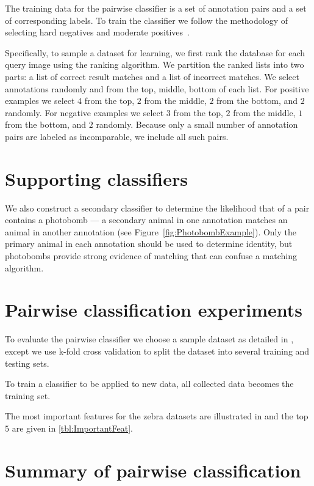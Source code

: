 The training data for the pairwise classifier is a set of annotation pairs and
  a set of corresponding labels.
To train the classifier we follow the methodology of selecting hard negatives
  and moderate positives~\cite{shi_embedding_2016}.

Specifically, to sample a dataset for learning, we first rank the database for
  each query image using the ranking algorithm.
We partition the ranked lists into two parts:
a list of correct result matches and a list of incorrect matches.
We select annotations randomly and from the top, middle, bottom of each list.
For positive examples we select $4$ from the top, $2$ from the middle, $2$
  from the bottom, and $2$ randomly.
For negative examples we select $3$ from the top, $2$ from the middle, $1$
  from the bottom, and $2$ randomly.
Because only a small number of annotation pairs are labeled as incomparable,
  we include all such pairs.

\section{Supporting classifiers}

    We also construct a secondary classifier to determine the likelihood that
      of a pair contains a photobomb --- a secondary animal in one annotation
      matches an animal in another annotation (\eg see
      Figure~\ref{fig:PhotobombExample}).
    Only the primary animal in each annotation should be used to determine
      identity, but photobombs provide strong evidence of matching that can
      confuse a matching algorithm.



\section{Pairwise classification experiments}

To evaluate the pairwise classifier we choose a sample dataset as detailed in
  , except we use k-fold cross validation to split the
  dataset into several training and testing sets.
  
To train a classifier to be applied to new data, all collected data becomes
  the training set.



\WordCloud{}
\ImportantFeat{}

The most important features for the zebra datasets are illustrated in
 and the top $5$ are given in \cref{tbl:ImportantFeat}.

\section{Summary of pairwise classification}

